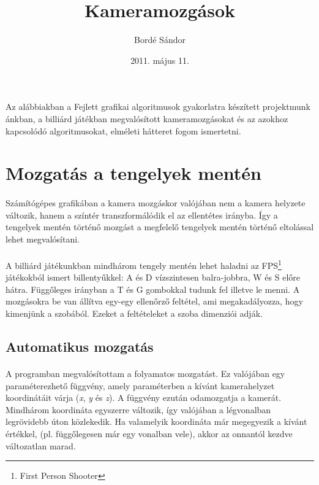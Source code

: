 \documentclass[10pt,a4paper]{article}
\author{Bordé Sándor}
\date{2011. május 11.}
\title{Kameramozgások}
\begin{document}
\maketitle
\paragraph*{}
Az alábbiakban a Fejlett grafikai algoritmusok gyakorlatra készített projektmunk
ánkban, a billiárd játékban megvalósított kameramozgásokat és az azokhoz kapcsolódó
 algoritmusokat, elméleti hátteret fogom ismertetni.
\section*{Mozgatás a tengelyek mentén}
\paragraph*{}
Számítógépes grafikában a kamera mozgáskor valójában nem a kamera helyzete változik, hanem a színtér transzformálódik el az ellentétes irányba. Így a tengelyek mentén történő mozgást a megfelelő tengelyek mentén történő eltolással lehet megvalósítani.
\paragraph*{}
A billiárd játékunkban mindhárom tengely mentén lehet haladni az FPS\footnote{First Person Shooter} játékokból ismert billentyűkkel: A és D vízszintesen balra-jobbra, W és S előre hátra. Függőleges irányban a T és G gombokkal tudunk fel illetve le menni. A mozgásokra be van állítva egy-egy ellenőrző feltétel, ami megakadályozza, hogy kimenjünk a szobából. Ezeket a feltételeket a szoba dimenziói adják.
\subsection*{Automatikus mozgatás}
\paragraph*{}
A programban megvalósítottam a folyamatos mozgatást. Ez valójában egy paraméterezhető függvény, amely paraméterben a kívánt kamerahelyzet koordinátáit várja (\textit{x}, \textit{y} és \textit{z}). A függvény ezután odamozgatja a kamerát. Mindhárom koordináta egyszerre változik, így valójában a légvonalban legrövidebb úton közlekedik. Ha valamelyik koordináta már megegyezik a kívánt értékkel, (pl. függőlegesen már egy vonalban vele), akkor az onnantól kezdve változatlan marad.
\end{document}
